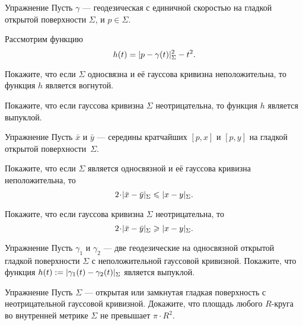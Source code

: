\begin{thm}{Упражнение}\label{ex:geod-convexity}
Пусть $\gamma$ --- геодезическая с единичной скоростью на гладкой открытой поверхности
$\Sigma$, и $p\in\Sigma$.

Рассмотрим функцию
\[h(t)=\dist{p}{\gamma(t)}\Sigma^2-t^2.\]

\begin{subthm}{}
Покажите, что если $\Sigma$ односвязна и её гауссова кривизна неположительна, то функция $h$ является вогнутой.
\end{subthm}

\begin{subthm}{} Покажите, что если гауссова кривизна $\Sigma$ неотрицательна, то функция $h$ является выпуклой.
\end{subthm}

\end{thm}

\begin{thm}{Упражнение}\label{ex:midpoints}
Пусть $\bar x$ и $\bar y$ --- середины кратчайших $[p,x]$ и $[p,y]$ на гладкой открытой поверхности~$\Sigma$.

\begin{subthm}{}
Покажите, что если $\Sigma$ является односвязной и её гауссова кривизна неположительна, то 
\[2\cdot \dist{\bar x}{\bar y}\Sigma\le \dist{x}{y}\Sigma.\]
\end{subthm}

\begin{subthm}{} Покажите, что если гауссова кривизна $\Sigma$ неотрицательна, то 
 \[2\cdot \dist{\bar x}{\bar y}\Sigma\ge \dist{x}{y}\Sigma.\]
\end{subthm}

\end{thm}

\begin{thm}{Упражнение}\label{ex:convex-dist}
Пусть $\gamma_1$ и $\gamma_2$ --- две геодезические на односвязной открытой гладкой поверхности $\Sigma$ с неположительной гауссовой кривизной.
Покажите, что функция $h(t)\df\dist{\gamma_1(t)}{\gamma_2(t)}\Sigma$
является выпуклой.
\end{thm}

\begin{thm}{Упражнение}\label{ex:disc+}
Пусть $\Sigma$ --- открытая или замкнутая гладкая поверхность с неотрицательной гауссовой кривизной.
Докажите, что площадь любого $R$-круга во внутренней метрике $\Sigma$ не превышает $\pi\cdot R^2$.
\end{thm}

